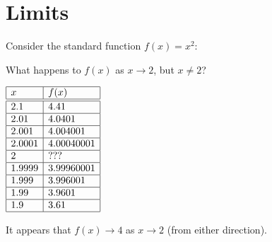 \documentclass[letterpaper,12pt,fleqn]{article}
\begin{document}
\section*{Limits}

\begin{example}

  Consider the standard function \(f(x)=x^2\):

  \bigskip

  \begin{center}
  \end{center}

  \bigskip

  What happens to \(f(x)\) as \(x\to2\), but \(x\ne 2\)?

  \bigskip

  \begin{center}
    \(\begin{array}{|l|l|}
    \hline
    x & f(x) \\
    \hline
    \hline
    2.1 & 4.41 \\
    \hline
    2.01 & 4.0401 \\
    \hline
    2.001 & 4.004001 \\
    \hline
    2.0001 & 4.00040001 \\
    \hline
    2 & ??? \\
    \hline
    1.9999 & 3.99960001 \\
    \hline
    1.999 & 3.996001 \\
    \hline
    1.99 & 3.9601 \\
    \hline
    1.9 & 3.61 \\
    \hline
    \end{array}\)
  \end{center}

  \bigskip

  It appears that \(f(x)\to4\) as \(x\to2\) (from either direction).
\end{example}
\end{document}
